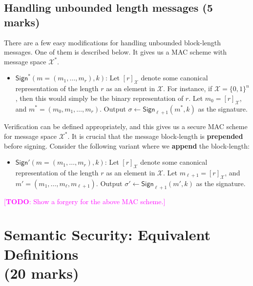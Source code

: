 \documentclass[10pt,addpoints]{exam}
\newcommand{\calX}{\mathcal{X}}
\newcommand{\sign}{\mathsf{Sign}}
\newcommand{\TODO}[1]{\textcolor{magenta}{[\textbf{TODO}: #1]}}
\newcommand{\bit}{\{0,1\}}
\theoremstyle{definition}
\begin{document}
    \color{blue}

    \subsection{Handling unbounded length messages (5 marks)} 
    There are a few easy modifications for handling unbounded block-length messages. One of them is described below. It gives us a MAC scheme with message space $\calX^*$. 

        \begin{itemize}
            \item $\sign^*(m = (m_1, \ldots, m_r), k)$: Let $[r]_{\calX}$ denote some canonical representation of the length $r$ as an element in $\calX$. For instance, if $\calX = \bit^n$, then this would simply be the binary representation of $r$. Let $m_0 = [r]_{\calX}$, and $m^* = (m_0, m_1, \ldots, m_r)$. Output $\sigma \gets \sign_{\ell+1}(m^*, k)$ as the signature. 

        \end{itemize}


        Verification can be defined appropriately, and this gives us a secure MAC scheme for message space $\calX^*$. It is crucial that the message block-length is \textbf{prepended} before signing. Consider the following variant where we \textbf{append} the block-length: 


        \begin{itemize}
            \item $\sign'(m = (m_1, \ldots, m_r), k)$: Let $[r]_{\calX}$ denote some canonical representation of the length $r$ as an element in $\calX$. Let $m_{\ell+1} = [r]_{\calX}$, and $m' = (m_1, \ldots, m_{\ell}, m_{\ell+1})$. Output $\sigma' \gets \sign_{\ell+1}(m', k)$ as the signature. 

        \end{itemize}

        \TODO{Show a forgery for the above MAC scheme.}

         
    \vspace{20pt}
    


\newpage

\color{blue}
\section{Semantic Security: Equivalent Definitions\\ (20 marks)}
\end{document}
